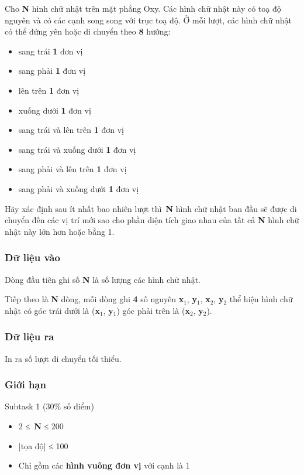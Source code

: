 

Cho \textbf{N} hình chữ nhật trên mặt phẳng Oxy. Các hình chữ nhật này có toạ độ nguyên và có các cạnh song song với trục toạ độ. Ở mỗi lượt, các hình chữ nhật có thể đứng yên hoặc di chuyển theo \textbf{8} hướng:
\begin{itemize}
	\item sang trái \textbf{1} đơn vị
	\item sang phải \textbf{1} đơn vị
	\item lên trên \textbf{1} đơn vị
	\item xuống dưới \textbf{1} đơn vị
	\item sang trái và lên trên \textbf{1} đơn vị
	\item sang trái và xuống dưới \textbf{1} đơn vị
	\item sang phải và lên trên \textbf{1} đơn vị
	\item sang phải và xuống dưới \textbf{1} đơn vị
\end{itemize}

Hãy xác định sau ít nhất bao nhiên lượt thì \textbf{N} hình chữ nhật ban đầu sẽ được di chuyển đến các vị trí mới sao cho phần diện tích giao nhau của tất cả \textbf{N} hình chữ nhật này lớn hơn hoặc bằng 1.

\subsubsection{Dữ liệu vào}

Dòng đầu tiên ghi số \textbf{N} là số lượng các hình chữ nhật.

Tiếp theo là \textbf{N} dòng, mỗi dòng ghi \textbf{4} số nguyên \textbf{x$_1$}, \textbf{y$_1$}, \textbf{x$_2$}, \textbf{y$_2$} thể hiện hình chữ nhật có góc trái dưới là (\textbf{x$_1$}, \textbf{y$_1$}) góc phải trên là (\textbf{x$_2$}, \textbf{y$_2$}).

\subsubsection{Dữ liệu ra}

In ra số lượt di chuyển tối thiểu.

\subsubsection{Giới hạn}

Subtask 1 (30\% số điểm)
\begin{itemize}
	\item 2 ≤ \textbf{N} ≤ 200
	\item |tọa độ| ≤ 100
	\item Chỉ gồm các \textbf{hình vuông đơn vị} với cạnh là 1
\end{itemize}

